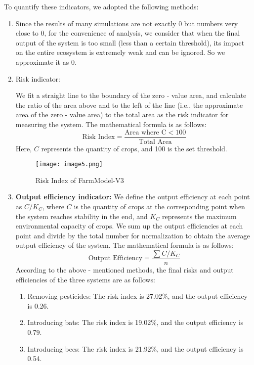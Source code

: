\documentclass[12pt]{article}  %
\begin{document}
To quantify these indicators, we adopted the following methods:
\begin{enumerate}
    \item Since the results of many simulations are not exactly 0 but numbers very close to 0, for the convenience of analysis, we consider that when the final output of the system is too small (less than a certain threshold), its impact on the entire ecosystem is extremely weak and can be ignored. So we approximate it as 0.

    \item Risk indicator: 
    
    We fit a straight line to the boundary of the zero - value area, and calculate the ratio of the area above and to the left of the line (i.e., the approximate area of the zero - value area) to the total area as the risk indicator for measuring the system. The mathematical formula is as follows:
    $$
\text{Risk Index}=\frac{\text{Area where C}<100}{\text{Total Area}}
$$
Here, $C$ represents the quantity of crops, and 100 is the set threshold.
\begin{figure}[ht]
    \centering
    \texttt{[image: image5.png]}
    \caption{Risk Index of FarmModel-V3}
\end{figure}
    \item \textbf{Output efficiency indicator:} We define the output efficiency at each point as \(C/K_{C}\), where \(C\) is the quantity of crops at the corresponding point when the system reaches stability in the end, and \(K_{C}\) represents the maximum environmental capacity of crops. We sum up the output efficiencies at each point and divide by the total number for normalization to obtain the average output efficiency of the system. The mathematical formula is as follows:
    $$
    \text{Output Efficiency}=\frac{\sum C/K_{C}}{n}
    $$
    According to the above - mentioned methods, the final risks and output efficiencies of the three systems are as follows:
    \begin{enumerate}
        \item Removing pesticides: The risk index is 27.02\%, and the output efficiency is 0.26.
        \item Introducing bats: The risk index is 19.02\%, and the output efficiency is 0.79.
        \item Introducing bees: The risk index is 21.92\%, and the output efficiency is 0.54.
        
    \end{enumerate}
\end{enumerate}
\end{document}
